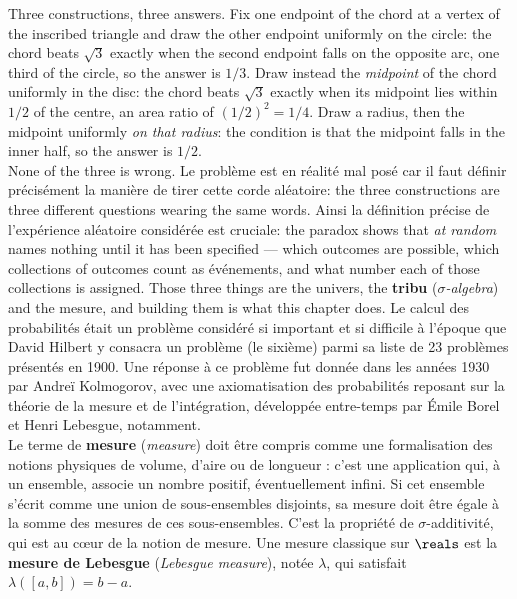 \medskip
Three constructions, three answers. Fix one endpoint of the chord at a vertex of
the inscribed triangle and draw the other endpoint uniformly on the circle: the
chord beats $\sqrt{3}$ exactly when the second endpoint falls on the opposite arc,
one third of the circle, so the answer is $1/3$. Draw instead the \emph{midpoint}
of the chord uniformly in the disc: the chord beats $\sqrt{3}$ exactly when its
midpoint lies within $1/2$ of the centre, an area ratio of $(1/2)^{2} = 1/4$. Draw
a radius, then the midpoint uniformly \emph{on that radius}: the condition is that
the midpoint falls in the inner half, so the answer is $1/2$.\\

None of the three is wrong. Le problème est en réalité mal posé car il faut
définir précisément la manière de tirer cette corde aléatoire: the three
constructions are three different questions wearing the same words. Ainsi la
définition précise de l'expérience aléatoire considérée est cruciale: the paradox
shows that \emph{at random} names nothing until it has been specified --- which
outcomes are possible, which collections of outcomes count as événements, and what
number each of those collections is assigned.
Those three things are the univers, the \textbf{tribu} (\textit{$\sigma$-algebra})
and the mesure, and building them is what this chapter does. Le calcul des
probabilités était un problème considéré si important et si difficile à l'époque
que David Hilbert y consacra un problème (le sixième) parmi sa liste de 23 problèmes
présentés en 1900. Une réponse à ce problème fut donnée dans les années 1930 par
Andreï Kolmogorov, avec une axiomatisation des probabilités reposant sur la théorie
de la mesure et de l'intégration, développée entre-temps par Émile Borel et Henri
Lebesgue, notamment.\\

Le terme de \textbf{mesure} (\textit{measure}) doit être compris comme une
formalisation des notions physiques de volume, d'aire ou de longueur : c'est une
application qui, à un ensemble, associe un nombre positif, éventuellement infini.
Si cet ensemble s'écrit comme une union de sous-ensembles disjoints, sa mesure doit
être égale à la somme des mesures de ces sous-ensembles. C'est la propriété de
$\sigma$-additivité, qui est au cœur de la notion de mesure. Une mesure classique
sur $\reals$ est la \textbf{mesure de Lebesgue} (\textit{Lebesgue measure}), notée
$\lambda$, qui satisfait $\lambda([a,b]) = b - a$.\\

